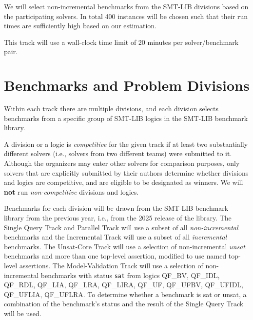 \documentclass[12pt]{article}
\newcommand{\maintrack}{Single Query Track\xspace}
\newcommand{\inctrack}{Incremental Track\xspace}
\newcommand{\ucoretrack}{Unsat-Core Track\xspace}
\newcommand{\mvaltrack}{Model-Validation Track\xspace}
\newcommand{\challtrack}{Industry-Challenge Track\xspace}
\newcommand{\paralleltrack}{Parallel Track\xspace}
\begin{document}
We will select non-incremental benchmarks from the SMT-LIB divisions
based on the participating solvers.  In total 400 instances will be
chosen such that their run times are sufficiently high based on our
estimation.

This track will use a wall-clock time limit of 20 minutes per
solver/benchmark pair.

\section{Benchmarks and Problem Divisions}

%
Within each track there are multiple divisions, and each division selects
benchmarks from a specific group of SMT-LIB logics in the SMT-LIB benchmark
library.

 A division or a logic is \emph{competitive}
for the given track if at least two substantially different solvers (i.e.,
solvers from two different teams) were submitted to it. Although the organizers
may enter other solvers for comparison purposes, only solvers that are
explicitly submitted by their authors determine whether divisions and logics are
competitive, and are eligible to be designated as winners. We will \textbf{not}
run \emph{non-competitive} divisions and logics.

Benchmarks for each division will be drawn from the SMT-LIB benchmark
library from the previous year, i.e., from the 2025 release of the library.
The \maintrack and \paralleltrack{} will use a
subset of all \emph{non-incremental} benchmarks and the \inctrack will
use a subset of all \emph{incremental} benchmarks.
%
%
The \ucoretrack will use a selection of non-incremental
\emph{unsat} benchmarks
and more than one top-level assertion, modified to use named
top-level assertions.  The \mvaltrack will use a selection of non-incremental
benchmarks with status \texttt{sat} from logics QF\_BV, QF\_IDL, QF\_RDL,
QF\_LIA, QF\_LRA, QF\_LIRA, QF\_UF, QF\_UFBV, QF\_UFIDL, QF\_UFLIA, QF\_UFLRA.
To determine whether a benchmark is sat or unsat, a combination of
the benchmark's status and the result of the \maintrack{} will be used.
\end{document}
